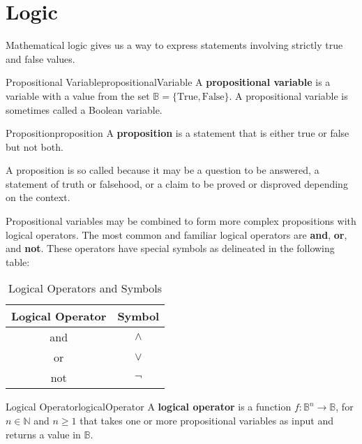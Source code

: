 \section{Logic}

Mathematical logic gives us a way to express statements involving
strictly true and false values.

\begin{definition}{Propositional Variable}{propositionalVariable}
  A \textbf{propositional variable} is a variable with a value from the set
  \( \mathbb{B} = \{ \text{True}, \text{False} \} \). A propositional variable
  is sometimes called a Boolean variable.
\end{definition}

\begin{definition}{Proposition}{proposition}
  A \textbf{proposition} is a statement that is either true or false but not both.
\end{definition}

A proposition is so called because it may be a question to be answered,
a statement of truth or falsehood, or a claim to be proved or disproved
depending on the context.

Propositional variables may be combined to form more complex propositions with
logical operators. The most common and familiar logical operators are \textbf{and}, \textbf{or},
and \textbf{not}. These operators have special symbols as delineated in the
following table:
\begin{table}[H]
  \centering
  \begin{tabular}{cc}
    \toprule
    Logical Operator & Symbol \\
    \midrule
    and & \( \land \) \\
    or & \( \lor \) \\
    not & \( \lnot \) \\
    \bottomrule
  \end{tabular}
  \caption{Logical Operators and Symbols}
\end{table}

\begin{definition}{Logical Operator}{logicalOperator}
  A \textbf{logical operator} is a function \( f: \mathbb{B}^n \to \mathbb{B} \),
  for \( n \in \mathbb{N} \) and \( n \ge 1 \) that takes one or more propositional variables
  as input and returns a value in \( \mathbb{B} \).
\end{definition}


